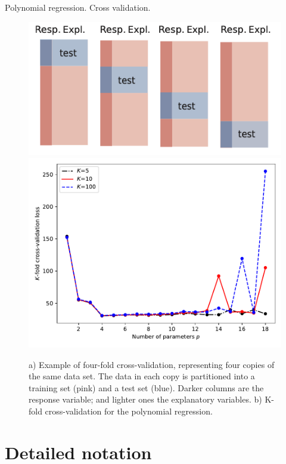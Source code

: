 \documentclass{beamer}
\begin{document}
\begin{frame}{Polynomial regression. Cross validation.}
  \begin{figure}
    \includegraphics[width=0.4\linewidth]{crossval}
    \includegraphics[width=0.4\linewidth]{crossvalpy}
    \label{fig:crossvalpy}
    \caption{a) Example of four-fold cross-validation, representing four copies of the same data set. The data in each copy is partitioned into a training set (pink) and a test set (blue).  Darker columns are the response variable; and lighter ones the explanatory variables. b) K-fold cross-validation for the polynomial regression.}
  \end{figure}
\end{frame}

\section{Detailed notation}
\end{document}
